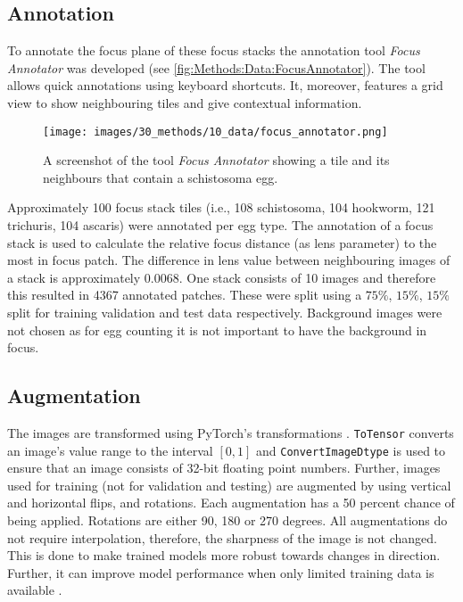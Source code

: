 \subsection{Annotation}
\label{sec:Methods:Data:Annotation}

To annotate the focus plane of these focus stacks the annotation tool \emph{Focus Annotator} \cite{kuchelmeister2022focus} was developed (see \autoref{fig:Methods:Data:FocusAnnotator}). The tool allows quick annotations using keyboard shortcuts. It, moreover, features a grid view to show neighbouring tiles and give contextual information.

\begin{figure}
    \centering
    \texttt{[image: images/30\_methods/10\_data/focus\_annotator.png]}
    \caption{A screenshot of the tool \emph{Focus Annotator} showing a tile and its neighbours that contain a schistosoma egg.}
    \label{fig:Methods:Data:FocusAnnotator}
\end{figure}


Approximately 100 focus stack tiles (i.e., 108 schistosoma, 104 hookworm, 121 trichuris, 104 ascaris) were annotated per egg type. The annotation of a focus stack is used to calculate the relative focus distance (as lens parameter) to the most in focus patch. The difference in lens value between neighbouring images of a stack is approximately $0.0068$.  One stack consists of 10 images and therefore this resulted in 4367 annotated patches. These were split using a $75\%$, $15\%$, $15\%$ split for training validation and test data respectively. Background images were not chosen as for egg counting it is not important to have the background in focus.

\subsection{Augmentation}
\label{sec:Methods:Data:Augmentation}

The images are transformed using PyTorch's transformations \cite{paszke2019pytorch, 2021pytorch}. \texttt{ToTensor} converts an image's value range to the interval $[0, 1]$ and \texttt{ConvertImageDtype} is used to ensure that an image consists of 32-bit floating point numbers. Further, images used for training (not for validation and testing) are augmented by using vertical and horizontal flips, and rotations. Each augmentation has a 50 percent chance of being applied. Rotations are either 90, 180 or 270 degrees. All augmentations do not require interpolation, therefore, the sharpness of the image is not changed. This is done to make trained models more robust towards changes in direction. Further, it can improve model performance when only limited training data is available \cite{shorten2019survey}.


